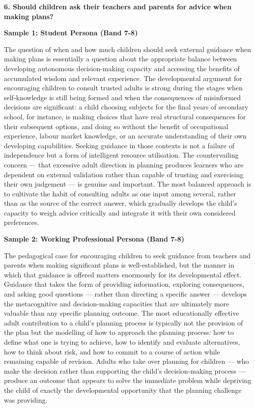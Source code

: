 \separator

\begin{ieltsquestion}
\textbf{6. Should children ask their teachers and parents for advice when making plans?}
\end{ieltsquestion}
\textbf{Sample 1: Student Persona (Band 7-8)}

The question of when and how much children should seek external guidance when making plans is essentially a question about the appropriate balance between developing autonomous decision-making capacity and accessing the benefits of accumulated wisdom and relevant experience. The developmental argument for encouraging children to consult trusted adults is strong during the stages when self-knowledge is still being formed and when the consequences of misinformed decisions are significant: a child choosing subjects for the final years of secondary school, for instance, is making choices that have real structural consequences for their subsequent options, and doing so without the benefit of occupational experience, labour market knowledge, or an accurate understanding of their own developing capabilities. Seeking guidance in those contexts is not a failure of independence but a form of intelligent resource utilisation. The countervailing concern — that excessive adult direction in planning produces learners who are dependent on external validation rather than capable of trusting and exercising their own judgement — is genuine and important. The most balanced approach is to cultivate the habit of consulting adults as one input among several, rather than as the source of the correct answer, which gradually develops the child's capacity to weigh advice critically and integrate it with their own considered preferences.

\textbf{Sample 2: Working Professional Persona (Band 7-8)}

The pedagogical case for encouraging children to seek guidance from teachers and parents when making significant plans is well-established, but the manner in which that guidance is offered matters enormously for its developmental effect. Guidance that takes the form of providing information, exploring consequences, and asking good questions — rather than directing a specific answer — develops the metacognitive and decision-making capacities that are ultimately more valuable than any specific planning outcome. The most educationally effective adult contribution to a child's planning process is typically not the provision of the plan but the modelling of how to approach the planning process: how to define what one is trying to achieve, how to identify and evaluate alternatives, how to think about risk, and how to commit to a course of action while remaining capable of revision. Adults who take over planning for children — who make the decision rather than supporting the child's decision-making process — produce an outcome that appears to solve the immediate problem while depriving the child of exactly the developmental opportunity that the planning challenge was providing.


